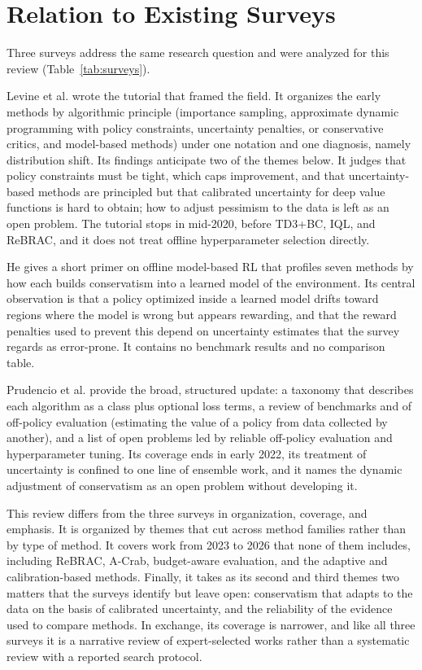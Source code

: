 \documentclass[journal]{IEEEtran}
\begin{document}
\section{Relation to Existing Surveys}
\label{sec:surveys}
Three surveys address the same research question and were analyzed for this review (Table~\ref{tab:surveys}).

Levine et al. \cite{levine2020tutorial} wrote the tutorial that framed the field. It organizes the early methods by algorithmic principle (importance sampling, approximate dynamic programming with policy constraints, uncertainty penalties, or conservative critics, and model-based methods) under one notation and one diagnosis, namely distribution shift. Its findings anticipate two of the themes below. It judges that policy constraints must be tight, which caps improvement, and that uncertainty-based methods are principled but that calibrated uncertainty for deep value functions is hard to obtain; how to adjust pessimism to the data is left as an open problem. The tutorial stops in mid-2020, before TD3+BC, IQL, and ReBRAC, and it does not treat offline hyperparameter selection directly.

He \cite{he2023survey} gives a short primer on offline model-based RL that profiles seven methods by how each builds conservatism into a learned model of the environment. Its central observation is that a policy optimized inside a learned model drifts toward regions where the model is wrong but appears rewarding, and that the reward penalties used to prevent this \cite{kidambi2020morel,yu2020mopo} depend on uncertainty estimates that the survey regards as error-prone. It contains no benchmark results and no comparison table.

Prudencio et al. \cite{prudencio2024survey} provide the broad, structured update: a taxonomy that describes each algorithm as a class plus optional loss terms, a review of benchmarks and of off-policy evaluation (estimating the value of a policy from data collected by another), and a list of open problems led by reliable off-policy evaluation and hyperparameter tuning. Its coverage ends in early 2022, its treatment of uncertainty is confined to one line of ensemble work, and it names the dynamic adjustment of conservatism as an open problem without developing it.

This review differs from the three surveys in organization, coverage, and emphasis. It is organized by themes that cut across method families rather than by type of method. It covers work from 2023 to 2026 that none of them includes, including ReBRAC, A-Crab, budget-aware evaluation, and the adaptive and calibration-based methods. Finally, it takes as its second and third themes two matters that the surveys identify but leave open: conservatism that adapts to the data on the basis of calibrated uncertainty, and the reliability of the evidence used to compare methods. In exchange, its coverage is narrower, and like all three surveys it is a narrative review of expert-selected works rather than a systematic review with a reported search protocol.
\end{document}
